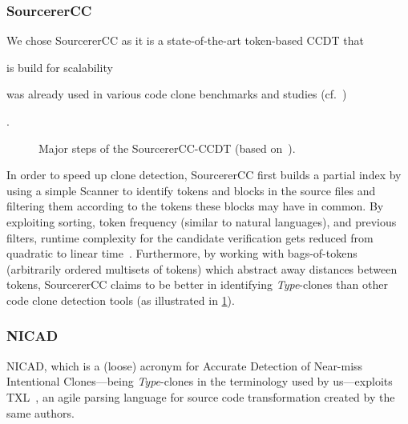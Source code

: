 \documentclass[10pt,journal,compsoc]{IEEEtran}
\def\T#1{\textsl{Type\nobreakdash-#1}}
\begin{document}
\subsubsection{SourcererCC}\label{SourcererCC}
We chose SourcererCC as it is a state-of-the-art token-based CCDT that \begin{inlist}
  \item is build for scalability
  \item was already used in various code clone benchmarks and studies (cf.~\cite{10.1145/3133908,ain2019systematic,su2016code})
\end{inlist}.

\begin{figure}
\caption{Major steps of the SourcererCC-CCDT (based on~\cite[Figure 2]{SourcererCC}).}
\label{fig:steps-sourcerercc}
\end{figure}

In order to speed up clone detection, SourcererCC first builds a partial index by using a simple Scanner to identify tokens and blocks in the source files and filtering them according to the tokens these blocks may have in common.
By exploiting sorting, token frequency (similar to natural languages), and previous filters, runtime complexity for the candidate verification gets reduced from quadratic to linear time~\cite{SourcererCC}.
Furthermore, by working with bags-of-tokens (arbitrarily ordered multisets of tokens) which abstract away distances between tokens, SourcererCC claims to be better in identifying \T3-clones than other code clone detection tools (as illustrated in \cref{fig:steps-sourcerercc}).


\subsubsection{NICAD}
NICAD, which is a (loose) acronym for Accurate Detection of Near-miss Intentional Clones---being \T3-clones in the terminology used by us---exploits TXL~\cite{cordy2006txl}, an agile parsing language for source code transformation created by the same authors.
\end{document}
